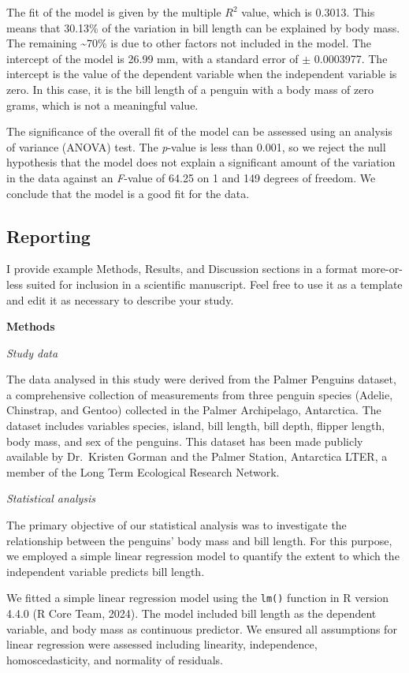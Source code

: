 \documentclass[
  letterpaper,
]{book}
\begin{document}
The fit of the model is given by the multiple \(R^2\) value, which is
0.3013. This means that 30.13\% of the variation in bill length can be
explained by body mass. The remaining \textasciitilde70\% is due to
other factors not included in the model. The intercept of the model is
26.99 mm, with a standard error of \(\pm\) 0.0003977. The intercept is
the value of the dependent variable when the independent variable is
zero. In this case, it is the bill length of a penguin with a body mass
of zero grams, which is not a meaningful value.

The significance of the overall fit of the model can be assessed using
an analysis of variance (ANOVA) test. The \emph{p}-value is less than
0.001, so we reject the null hypothesis that the model does not explain
a significant amount of the variation in the data against an
\emph{F}-value of 64.25 on 1 and 149 degrees of freedom. We conclude
that the model is a good fit for the data.

\subsection{Reporting}\label{reporting}

I provide example Methods, Results, and Discussion sections in a format
more-or-less suited for inclusion in a scientific manuscript. Feel free
to use it as a template and edit it as necessary to describe your study.

\textbf{Methods}

\emph{Study data}

The data analysed in this study were derived from the Palmer Penguins
dataset, a comprehensive collection of measurements from three penguin
species (Adelie, Chinstrap, and Gentoo) collected in the Palmer
Archipelago, Antarctica. The dataset includes variables species, island,
bill length, bill depth, flipper length, body mass, and sex of the
penguins. This dataset has been made publicly available by Dr.~Kristen
Gorman and the Palmer Station, Antarctica LTER, a member of the Long
Term Ecological Research Network.

\emph{Statistical analysis}

The primary objective of our statistical analysis was to investigate the
relationship between the penguins' body mass and bill length. For this
purpose, we employed a simple linear regression model to quantify the
extent to which the independent variable predicts bill length.

We fitted a simple linear regression model using the \texttt{lm()}
function in R version 4.4.0 (R Core Team, 2024). The model included bill
length as the dependent variable, and body mass as continuous predictor.
We ensured all assumptions for linear regression were assessed including
linearity, independence, homoscedasticity, and normality of residuals.
\end{document}
